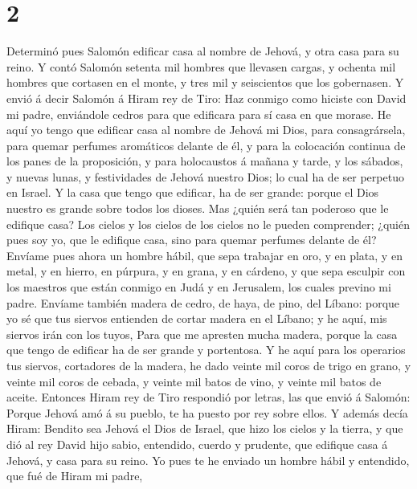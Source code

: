 \hypertarget{section-1}{%
\section{2}\label{section-1}}

 Determinó pues Salomón edificar casa al nombre de Jehová,
y otra casa para su reino.  Y contó Salomón setenta mil
hombres que llevasen cargas, y ochenta mil hombres que cortasen en el
monte, y tres mil y seiscientos que los gobernasen.  Y
envió á decir Salomón á Hiram rey de Tiro: Haz conmigo como hiciste con
David mi padre, enviándole cedros para que edificara para sí casa en que
morase.  He aquí yo tengo que edificar casa al nombre de
Jehová mi Dios, para consagrársela, para quemar perfumes aromáticos
delante de él, y para la colocación continua de los panes de la
proposición, y para holocaustos á mañana y tarde, y los sábados, y
nuevas lunas, y festividades de Jehová nuestro Dios; lo cual ha de ser
perpetuo en Israel.  Y la casa que tengo que edificar, ha
de ser grande: porque el Dios nuestro es grande sobre todos los dioses.
 Mas ¿quién será tan poderoso que le edifique casa? Los
cielos y los cielos de los cielos no le pueden comprender; ¿quién pues
soy yo, que le edifique casa, sino para quemar perfumes delante de él?
 Envíame pues ahora un hombre hábil, que sepa trabajar en
oro, y en plata, y en metal, y en hierro, en púrpura, y en grana, y en
cárdeno, y que sepa esculpir con los maestros que están conmigo en Judá
y en Jerusalem, los cuales previno mi padre.  Envíame
también madera de cedro, de haya, de pino, del Líbano: porque yo sé que
tus siervos entienden de cortar madera en el Líbano; y he aquí, mis
siervos irán con los tuyos,  Para que me apresten mucha
madera, porque la casa que tengo de edificar ha de ser grande y
portentosa.  Y he aquí para los operarios tus siervos,
cortadores de la madera, he dado veinte mil coros de trigo en grano, y
veinte mil coros de cebada, y veinte mil batos de vino, y veinte mil
batos de aceite.  Entonces Hiram rey de Tiro respondió
por letras, las que envió á Salomón: Porque Jehová amó á su pueblo, te
ha puesto por rey sobre ellos.  Y además decía Hiram:
Bendito sea Jehová el Dios de Israel, que hizo los cielos y la tierra, y
que dió al rey David hijo sabio, entendido, cuerdo y prudente, que
edifique casa á Jehová, y casa para su reino.  Yo pues te
he enviado un hombre hábil y entendido, que fué de Hiram mi padre,
